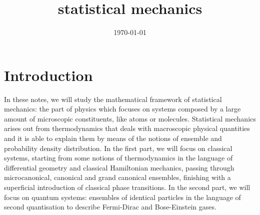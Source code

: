 \documentclass[a4paper, 12pt]{memoir}
\title{statistical mechanics}
\date{\today}
\begin{document}
\frontmatter



\tableofcontents

\mainmatter



\chapter*{Introduction}

    In these notes, we will study the mathematical framework of statistical mechanics: the part of physics which focuses on systems composed by a large amount of microscopic constituents, like atoms or molecules. Statistical mechanics arises out from thermodynamics that deals with macroscopic physical quantities and it is able to explain them by means of the notions of ensemble and probability density distribution. In the first part, we will focus on classical systems, starting from some notions of thermodynamics in the language of differential geometry and classical Hamiltonian mechanics, passing through microcanonical, canonical and grand canonical ensembles, finishing with a superficial introduction of classical phase transitions. In the second part, we will focus on quantum systems: ensembles of identical particles in the language of second quantisation to describe Fermi-Dirac and Bose-Einstein gases.
    








\backmatter

\nocite{smlecture}
\nocite{ercolessi}
\nocite{mussardo}

\clearpage
\listoffigures

\clearpage
\listoftables

\clearpage
\listofequations

\clearpage
{}
\printbibliography
\end{document}
